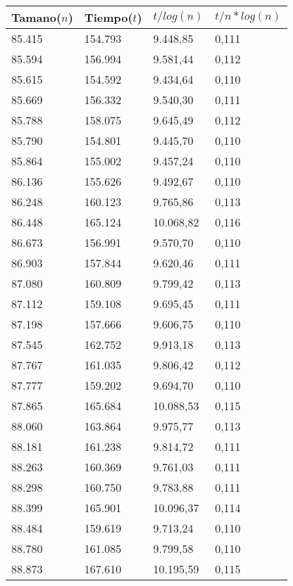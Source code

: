 \begin{table}[H]
\parbox{0.3\textwidth}{
  \begin{tabular}{| l | l | l |l |}
    \hline
    Tamano($n$) & Tiempo($t$) & $t / log(n)$ & $t / n*log(n)$ \\ \hline
85.415	&	154.793	&	9.448,85	&	0,111	\\ \hline
85.594	&	156.994	&	9.581,44	&	0,112	\\ \hline
85.615	&	154.592	&	9.434,64	&	0,110	\\ \hline
85.669	&	156.332	&	9.540,30	&	0,111	\\ \hline
85.788	&	158.075	&	9.645,49	&	0,112	\\ \hline
85.790	&	154.801	&	9.445,70	&	0,110	\\ \hline
85.864	&	155.002	&	9.457,24	&	0,110	\\ \hline
86.136	&	155.626	&	9.492,67	&	0,110	\\ \hline
86.248	&	160.123	&	9.765,86	&	0,113	\\ \hline
86.448	&	165.124	&	10.068,82	&	0,116	\\ \hline
86.673	&	156.991	&	9.570,70	&	0,110	\\ \hline
86.903	&	157.844	&	9.620,46	&	0,111	\\ \hline
87.080	&	160.809	&	9.799,42	&	0,113	\\ \hline
87.112	&	159.108	&	9.695,45	&	0,111	\\ \hline
87.198	&	157.666	&	9.606,75	&	0,110	\\ \hline
87.545	&	162.752	&	9.913,18	&	0,113	\\ \hline
87.767	&	161.035	&	9.806,42	&	0,112	\\ \hline
87.777	&	159.202	&	9.694,70	&	0,110	\\ \hline
87.865	&	165.684	&	10.088,53	&	0,115	\\ \hline
88.060	&	163.864	&	9.975,77	&	0,113	\\ \hline
88.181	&	161.238	&	9.814,72	&	0,111	\\ \hline
88.263	&	160.369	&	9.761,03	&	0,111	\\ \hline
88.298	&	160.750	&	9.783,88	&	0,111	\\ \hline
88.399	&	165.901	&	10.096,37	&	0,114	\\ \hline
88.484	&	159.619	&	9.713,24	&	0,110	\\ \hline
88.780	&	161.085	&	9.799,58	&	0,110	\\ \hline
88.873	&	167.610	&	10.195,59	&	0,115	\\ \hline

\end{tabular}}
\end{table}
